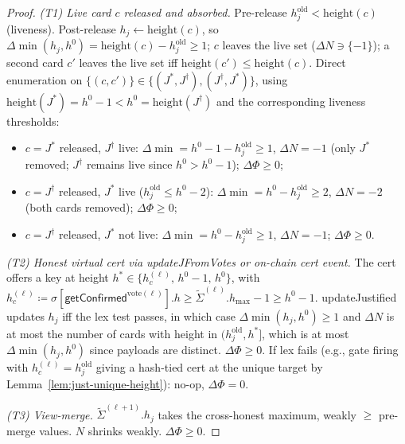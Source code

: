 \documentclass{article}
\newcommand{\hmax}{\ensuremath{h_{\max}}\xspace}
\newcommand{\updateJFromVotes}{\textsf{updateJFromVotes}\xspace}
\newcommand{\vote}{\ensuremath{\mathrm{vote}}}
\newcommand{\comm}[1]{\ensuremath{\widetilde{#1}}}
\newcommand{\updateJustified}{\textsf{updateJustified}\xspace}
\newcommand{\getConfirmed}{\textsf{getConfirmed}\xspace}
\theoremstyle{plain}
\theoremstyle{definition}
\theoremstyle{remark}
\begin{document}
\begin{proof}
\emph{(T1) Live card $c$ released and absorbed.}
Pre-release $h_j^{\mathrm{old}} < \mathrm{height}(c)$ (liveness). Post-release $h_j \gets \mathrm{height}(c)$, so $\Delta \min(h_j, h^0) = \mathrm{height}(c) - h_j^{\mathrm{old}} \geq 1$; $c$ leaves the live set ($\Delta N \ni \{-1\}$); a second card $c'$ leaves the live set iff $\mathrm{height}(c') \leq \mathrm{height}(c)$.
Direct enumeration on $\{(c, c')\} \in \{(J^*, J^\dagger), (J^\dagger, J^*)\}$, using $\mathrm{height}(J^*) = h^0 - 1 < h^0 = \mathrm{height}(J^\dagger)$ and the corresponding liveness thresholds:
\begin{itemize}
  \item $c = J^*$ released, $J^\dagger$ live: $\Delta \min = h^0 - 1 - h_j^{\mathrm{old}} \geq 1$, $\Delta N = -1$ (only $J^*$ removed; $J^\dagger$ remains live since $h^0 > h^0 - 1$); $\Delta \Phi \geq 0$;
  \item $c = J^\dagger$ released, $J^*$ live ($h_j^{\mathrm{old}} \leq h^0 - 2$): $\Delta \min = h^0 - h_j^{\mathrm{old}} \geq 2$, $\Delta N = -2$ (both cards removed); $\Delta \Phi \geq 0$;
  \item $c = J^\dagger$ released, $J^*$ not live: $\Delta \min = h^0 - h_j^{\mathrm{old}} \geq 1$, $\Delta N = -1$; $\Delta \Phi \geq 0$.
\end{itemize}

\emph{(T2) Honest virtual cert via \updateJFromVotes{} or on-chain cert event.}
The cert offers a key at height $h^* \in \{h_c^{(\ell)},\, h^0 - 1,\, h^0\}$, with $h_c^{(\ell)} \coloneqq \sigma[\getConfirmed^{\vote(\ell)}].h \geq \comm{\Sigma}^{(\ell)}.\hmax - 1 \geq h^0 - 1$.
\updateJustified{} updates $h_j$ iff the lex test passes, in which case $\Delta \min(h_j, h^0) \geq 1$ and $\Delta N$ is at most the number of cards with height in $(h_j^{\mathrm{old}}, h^*]$, which is at most $\Delta \min(h_j, h^0)$ since payloads are distinct.
$\Delta \Phi \geq 0$.
If lex fails (e.g., gate firing with $h_c^{(\ell)} = h_j^{\mathrm{old}}$ giving a hash-tied cert at the unique target by Lemma~\ref{lem:just-unique-height}): no-op, $\Delta \Phi = 0$.

\emph{(T3) View-merge.}
$\comm{\Sigma}^{(\ell+1)}.h_j$ takes the cross-honest maximum, weakly $\geq$ pre-merge values.
$N$ shrinks weakly. $\Delta \Phi \geq 0$.


\end{proof}
\end{document}
